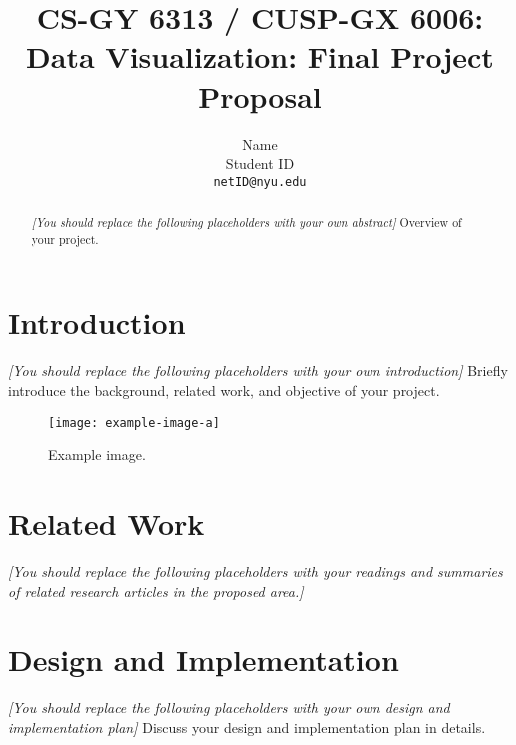 \documentclass[10pt,twocolumn,letterpaper]{article}
\newcommand{\note}[1]{{\it\color{red} #1}}
\begin{document}
\title{CS-GY 6313 / CUSP-GX 6006: Data Visualization: Final Project Proposal}
\author{Name\\Student ID\\{\tt\small netID@nyu.edu}}
\maketitle


\begin{abstract}

\note{[You should replace the following placeholders with your own abstract]}
Overview of your project. 

\end{abstract}


\section{Introduction}
\label{sec:introduction}

\note{[You should replace the following placeholders with your own introduction]}
Briefly introduce the background, related work, and objective of your project. 


\begin{figure}[!t]
  \centering
  \texttt{[image: example-image-a]}
  \caption{Example image.}
  \label{fig:example}
\end{figure}


\section{Related Work}
\label{sec:related}
\note{[You should replace the following placeholders with your readings and summaries of related research articles in the proposed area.]}


\section{Design and Implementation}
\label{sec:design}

\note{[You should replace the following placeholders with your own design and implementation plan]}
Discuss your design and implementation plan in details. 
\end{document}
